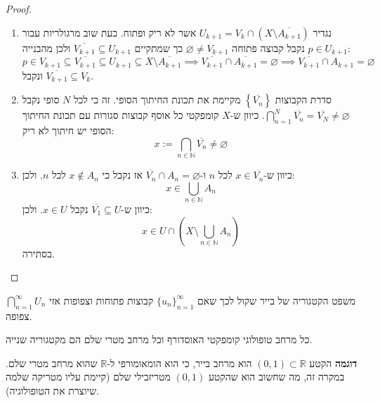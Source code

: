 \documentclass{tstextbook}
\begin{document}
\begin{proof}
\begin{enumerate}
    \item נגדיר \(U_{k+1}=V_{k}\cap \left( X \setminus \overline{A_{k+1}} \right)\) אשר לא ריק ופתוח. כעת שוב מרגולריות עבור \(p \in U_{k+1}\) נקבל קבוצה פתוחה \(\varnothing\neq V_{k+1}\) כך שמתקיים \({\overline{{V_{k+1}}}}\subseteq U_{k+1}\) ולכן מהבנייה: 
$$p \in V_{k+1}\subseteq\overline{{{V_{k+1}}}}\subseteq U_{k+1}\subseteq X\setminus\overline{{{A_{k+1}}}}\implies\overline{{{V_{k+1}}}}\cap \overline{A_{k+1}} =\varnothing \implies \overline{{{V_{k+1}}}}\cap {A_{k+1}} =\varnothing$$
ונקבל \(\overline{V_{k+1}}\subseteq V_{k}\).


    \item סדרת הקבוצות \(\left\{  \overline{V_{n}}  \right\}\) מקיימת את תכונת החיתוך הסופי. זה כי לכל \(N\) סופי נקבל \(\bigcap_{n=1}^{N}{\overline{{V_{n}}}}={\overline{{V_{N}}}}\ne\varnothing\). כיוון ש-\(X\) קומפקטי כל אוסף קבוצות סגורות עם תכונת החיתוך הסופי יש חיתוך לא ריק: 
$$x:=\bigcap_{n\in\mathbb{N}}{\overline{{V_{n}}}}\neq\varnothing$$


    \item כיוון ש-\(x \in \overline{V_{n}}\) לכל \(n\) ו-\(\overline{V_{n}}\cap A_{n}=\varnothing\) אז נקבל כי \(x \not \in A_{n}\) לכל \(n\). ולכן: 
$$x\in\bigcup_{n\in\mathbb{N}}A_{n}$$
כיוון ש-\(\overline{V_{1}}\subseteq U\) נקבל \(x \in U\). ולכן:
$$x\in U\cap\left(X\setminus\bigcup_{n\in\mathbb{N}}A_{n}\right)$$
בסתירה.


  \end{enumerate}
\end{proof}
\begin{corollary}
משפט הקטגוריה של בייר שקול לכך שאם \(\{ u_{n} \}_{n=1}^{\infty}\) קבוצות פתוחות וצפופות אזי \(\bigcap_{n=1}^{\infty} U_{n}\) צפופה.

\end{corollary}
\begin{corollary}
כל מרחב טופולוגי קומפקטי האוסדורף וכל מרחב מטרי שלם הם מקטגוריה שנייה.

\end{corollary}
\textbf{דוגמה}
הקטע \((0,1)\subset\mathbb{R}\) הוא מרחב בייר, כי הוא הומאומורפי ל-\(\mathbb{R}\) שהוא מרחב מטרי שלם. במקרה זה, מה שחשוב הוא שהקטע \((0,1)\) מטריזבילי שלם (קיימת עליו מטריקה שלמה שיוצרת את הטופולוגיה).
\end{document}
